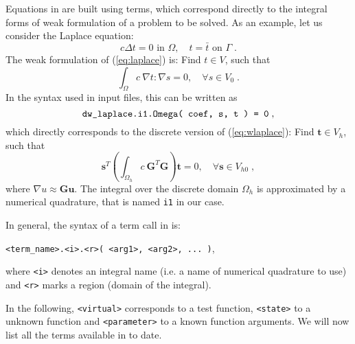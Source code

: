 Equations in \sfe{} are built using terms, which correspond directly to the
integral forms of weak formulation of a problem to be solved. As an example,
let us consider the Laplace equation:
\begin{equation}
  \label{eq:laplace}
  c \Delta t = 0 \mbox{ in }\Omega,\quad t = \bar{t} \mbox{ on } \Gamma \;.
\end{equation}
The weak formulation of (\ref{eq:laplace}) is: Find $t \in V$, such that
\begin{equation}
  \label{eq:wlaplace}
  \int_{\Omega} c\ \nabla t : \nabla s = 0, \quad \forall s \in V_0 \;.
\end{equation}
In the syntax used in \sfe{} input
files, this can be written as
\begin{equation}
  \label{eq:cpoisson}
    \verb|dw_laplace.i1.Omega( coef, s, t ) = 0| \;,
\end{equation}
which directly corresponds to the discrete version of (\ref{eq:wlaplace}):
Find $\bm{t} \in V_h$, such that
\begin{equation}
  \bm{s}^T (\int_{\Omega_h} c\ \bm{G}^T \bm{G}) \bm{t} = 0, \quad \forall \bm{s}
  \in V_{h0} \;,
\end{equation}
where $\nabla u \approx \bm{G} \bm{u}$. The integral over the discrete domain
$\Omega_h$ is approximated by a numerical quadrature, that is named
\verb|i1| in our case.

In general, the syntax of a term call in \sfe{} is:
\begin{center}
  \verb|<term_name>.<i>.<r>( <arg1>, <arg2>, ... )|,
\end{center}
where \verb|<i>| denotes an integral name (i.e. a name of numerical quadrature
to use) and \verb|<r>| marks a region (domain of the integral).

In the following, \verb|<virtual>| corresponds to a test function,
\verb|<state>| to a unknown function and \verb|<parameter>| to a known function
arguments. We will now list all the terms available in \sfe{} to date.

